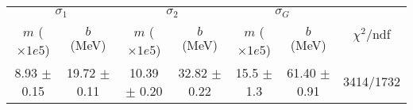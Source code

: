 \begin{tabular}{cc|cc|cc||c}
\multicolumn{2}{c|}{$\sigma_1$} & \multicolumn{2}{|c}{$\sigma_2$} & \multicolumn{2}{|c}{$\sigma_G$}  & \multirow{2}{*}{$\chi^2/$ndf}\\
$m$ ($\times1e5$) & $b$ (MeV) & $m$ ($\times1e5$) & $b$ (MeV) & $m$ ($\times1e5$) & $b$ (MeV) & \\
\hline
8.93 $\pm$ 0.15 & 19.72 $\pm$ 0.11 & 10.39 $\pm$ 0.20 & 32.82 $\pm$ 0.22 & 15.5 $\pm$ 1.3 & 61.40 $\pm$ 0.91 & 3414/1732\\
\end{tabular}
